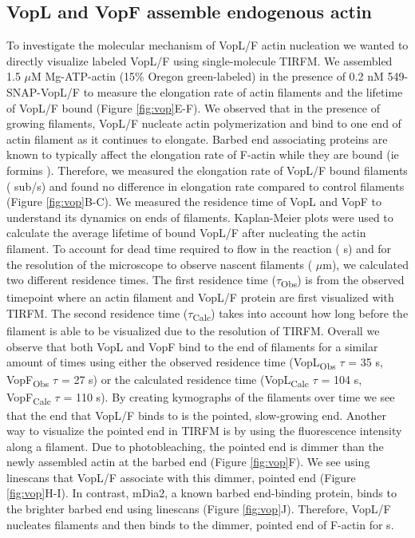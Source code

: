 \subsection{VopL and VopF assemble endogenous actin}\label{vops}
To investigate the molecular mechanism of VopL/F actin nucleation we wanted to directly visualize labeled VopL/F using single-molecule TIRFM. We assembled 1.5 $\mu$M Mg-ATP-actin (15\% Oregon green-labeled) in the presence of 0.2 nM 549-SNAP-VopL/F to measure the elongation rate of actin filaments and the lifetime of VopL/F bound (Figure \ref{fig:vop}E-F). We observed that in the presence of growing filaments, VopL/F nucleate actin polymerization and bind to one end of actin filament as it continues to elongate. Barbed end associating proteins are known to typically affect the elongation rate of F-actin while they are bound (ie formins \citep{kovar_molecular_2006}). Therefore, we measured the elongation rate of VopL/F bound filaments ( sub/s) and found no difference in elongation rate compared to control filaments (Figure \ref{fig:vop}B-C). We measured the residence time of VopL and VopF to understand its dynamics on ends of filaments. Kaplan-Meier plots were used to calculate the average lifetime of bound VopL/F after nucleating the actin filament. To account for dead time required to flow in the reaction ( s) and for the resolution of the microscope to observe nascent filaments ( $\mu$m), we calculated two different residence times. The first residence time ($\tau$\textsubscript{Obs}) is from the observed timepoint where an actin filament and VopL/F protein are first visualized with TIRFM. The second residence time ($\tau$\textsubscript{Calc}) takes into account how long before the filament is able to be visualized due to the resolution of TIRFM. Overall we observe that both VopL and VopF bind to the end of filaments for a similar amount of times using either the observed residence time (VopL\textsubscript{Obs} $\tau$ = 35 s, VopF\textsubscript{Obs} $\tau$ = 27 s) or the calculated residence time (VopL\textsubscript{Calc} $\tau$ = 104 s, VopF\textsubscript{Calc} $\tau$ = 110 s). By creating kymographs of the filaments over time we see that the end that VopL/F binds to is the pointed, slow-growing end. Another way to visualize the pointed end in TIRFM is by using the fluorescence intensity along a filament. Due to photobleaching, the pointed end is dimmer than the newly assembled actin at the barbed end (Figure \ref{fig:vop}F). We see using linescans that VopL/F associate with this dimmer, pointed end (Figure \ref{fig:vop}H-I). In contrast, mDia2, a known barbed end-binding protein, binds to the brighter barbed end using linescans (Figure \ref{fig:vop}J). Therefore, VopL/F nucleates filaments and then binds to the dimmer, pointed end of F-actin for  s.

